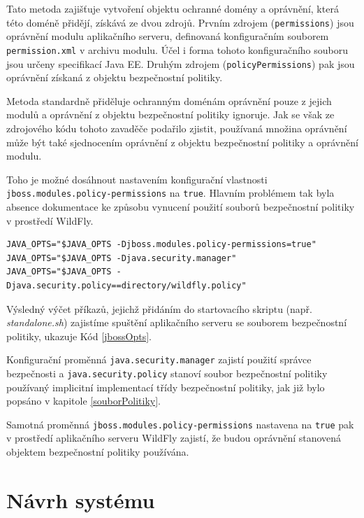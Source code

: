 Tato metoda zajišťuje vytvoření objektu ochranné domény a oprávnění, která této doméně přidějí, získává ze dvou zdrojů. Prvním zdrojem ({\tt permissions}) jsou oprávnění modulu aplikačního serveru, definovaná konfiguračním souborem {\tt permission.xml} v archivu modulu. Účel i forma tohoto konfiguračního souboru jsou určeny specifikací Java EE. \cite{javaEEspec} Druhým zdrojem ({\tt policyPermissions}) pak jsou oprávnění získaná z objektu bezpečnostní politiky.

Metoda standardně přiděluje ochranným doménám oprávnění pouze z jejich modulů a oprávnění z objektu bezpečnostní politiky ignoruje. Jak se však ze zdrojového kódu tohoto zavaděče podařilo zjistit, používaná množina oprávnění může být také sjednocením oprávnění z objektu bezpečnostní politiky a oprávnění modulu.

Toho je možné dosáhnout nastavením konfigurační vlastnosti {\tt jboss.modules.policy-permissions} na {\tt true}. Hlavním problémem tak byla absence dokumentace ke způsobu vynucení použití souborů bezpečnostní politiky v prostředí WildFly.

\begin{lstlisting}[caption=Způsob nastavení spuštění aplikačního serveru se souborem bezpečnostní politiky, label=jbossOpts]
JAVA_OPTS="$JAVA_OPTS -Djboss.modules.policy-permissions=true"
JAVA_OPTS="$JAVA_OPTS -Djava.security.manager"
JAVA_OPTS="$JAVA_OPTS -Djava.security.policy==directory/wildfly.policy"
\end{lstlisting}

Výsledný výčet příkazů, jejichž přidáním do startovacího skriptu (např. {\it standalone.sh}) zajistíme spuštění aplikačního serveru se souborem bezpečnostní politiky, ukazuje Kód \ref{jbossOpts}.

Konfigurační proměnná {\tt java.security.manager} zajistí použití správce bezpečnosti a {\tt java.security.policy} stanoví soubor bezpečnostní politiky používaný implicitní implementací třídy bezpečnostní politiky, jak již bylo popsáno v kapitole \ref{souborPolitiky}.

Samotná proměnná {\tt jboss.modules.policy-permissions} nastavena na {\tt true} pak v prostředí aplikačního serveru WildFly zajistí, že budou oprávnění stanovená objektem bezpečnostní politiky používána.

\chapter{Návrh systému}

